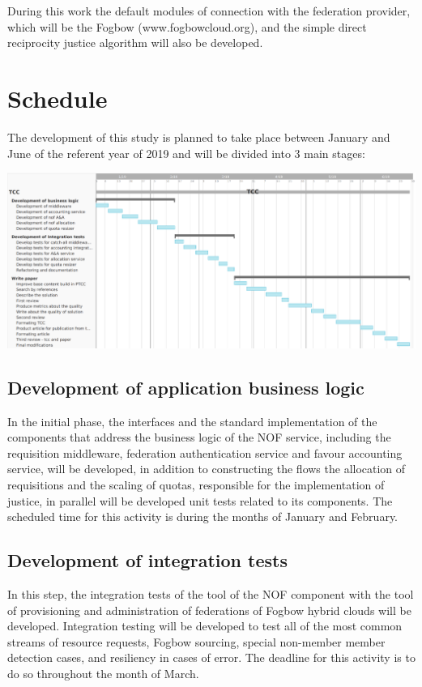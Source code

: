 \documentclass{article}
\begin{document}
During this work the default modules of connection with the federation provider, which will be the Fogbow (www.fogbowcloud.org), and the simple direct reciprocity justice algorithm will also be developed.

\section{Schedule}

The development of this study is planned to take place between January and June of the referent year of 2019 and will be divided into 3 main stages:

\begin{center}
\includegraphics[scale=0.35]{./image/TCC-schedule.png}
\end{center}

\subsection{Development of application business logic}
	In the initial phase, the interfaces and the standard implementation of the components that address the business logic of the NOF service, including the requisition middleware, federation authentication service and favour accounting service, will be developed, in addition to constructing the flows the allocation of requisitions and the scaling of quotas, responsible for the implementation of justice, in parallel will be developed unit tests related to its components. The scheduled time for this activity is during the months of January and February.
\subsection{Development of integration tests}
    In this step, the integration tests of the tool of the NOF component with the tool of provisioning and administration of federations of Fogbow hybrid clouds will be developed. Integration testing will be developed to test all of the most common streams of resource requests, Fogbow sourcing, special non-member member detection cases, and resiliency in cases of error. The deadline for this activity is to do so throughout the month of March.
\end{document}
